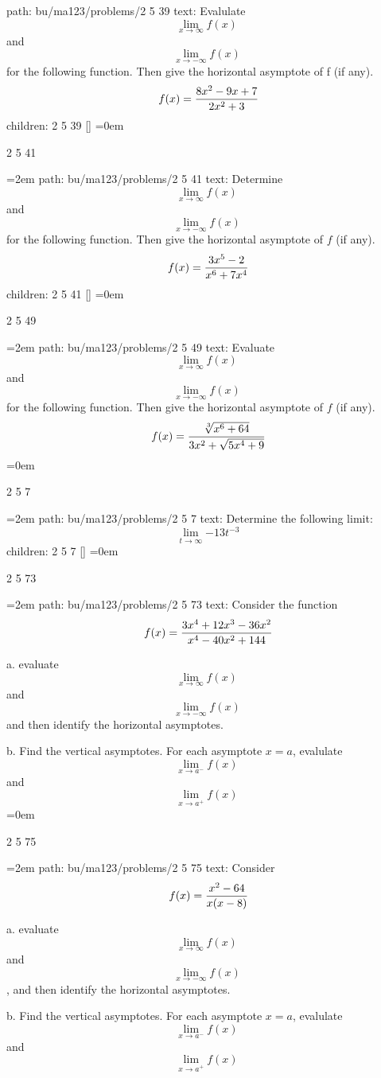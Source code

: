 path: bu/ma123/problems/2 5 39
\smallskip
text:  Evalulate $$\lim_{x \to \infty}{f(x)}$$ and $$\lim_{x \to -\infty}{f(x)}$$ for the following function. Then give the horizontal asymptote of f (if any). $$\ f(x) = { 8x^2 - 9x + 7 \over 2x^2 + 3 } $$
\smallskip
children: 2 5 39 []
\smallskip
\leftskip=0em
\par\endgroup
\bigskip
{}
2 5 41
\smallskip
\par\begingroup
\leftskip=2em
path: bu/ma123/problems/2 5 41
\smallskip
text:  Determine $$\lim_{x \to \infty}{f(x)}$$ and $$\lim_{x \to -\infty}{f(x)}$$ for the following function. Then give the horizontal asymptote of $f$ (if any). $$\ f(x) = { 3x^5 - 2 \over x^6 + 7x^4 } $$
\smallskip
children: 2 5 41 []
\smallskip
\leftskip=0em
\par\endgroup
\bigskip
{}
2 5 49
\smallskip
\par\begingroup
\leftskip=2em
path: bu/ma123/problems/2 5 49
\smallskip
text:  Evaluate $$\lim_{x \to \infty}{f(x)}$$ and $$\lim_{x \to -\infty}{f(x)}$$ for the following function. Then give the horizontal asymptote of $f$ (if any). $$\ f(x) = { \root 3 \of {x^6 + 64} \over 3x^2 + \sqrt {5x^4 + 9} } $$
\smallskip
\leftskip=0em
\par\endgroup
\bigskip
{}
2 5 7
\smallskip
\par\begingroup
\leftskip=2em
path: bu/ma123/problems/2 5 7
\smallskip
text:  Determine the following limit: $$\ \lim_{t \to \infty}{ -13t^{-3} } $$
\smallskip
children: 2 5 7 []
\smallskip
\leftskip=0em
\par\endgroup
\bigskip
{}
2 5 73
\smallskip
\par\begingroup
\leftskip=2em
path: bu/ma123/problems/2 5 73
\smallskip
text:  Consider the function $$\ f(x) = { 3x^4 + 12x^3 - 36x^2 \over x^4 - 40x^2 + 144 } $$ \par a. evaluate $$\lim_{x \to \infty}{f(x)}$$ and $$\lim_{x \to -\infty}{f(x)}$$ and then identify the horizontal asymptotes. \par b. Find the vertical asymptotes. For each asymptote $x = a$, evalulate $$\lim_{x \to a^{-}}{f(x)}$$ and $$\lim_{x \to a^{+}}{f(x)}$$
\smallskip
\leftskip=0em
\par\endgroup
\bigskip
{}
2 5 75
\smallskip
\par\begingroup
\leftskip=2em
path: bu/ma123/problems/2 5 75
\smallskip
text:  Consider $$\ f(x) = { x^2 - 64 \over x(x - 8) } $$ \par a. evaluate $$\lim_{x \to \infty}{f(x)}$$ and $$\lim_{x \to -\infty}{f(x)}$$, and then identify the horizontal asymptotes. \par b. Find the vertical asymptotes. For each asymptote $x = a$, evalulate $$\lim_{x \to a^{-}}{f(x)}$$ and $$\lim_{x \to a^{+}}{f(x)}$$
